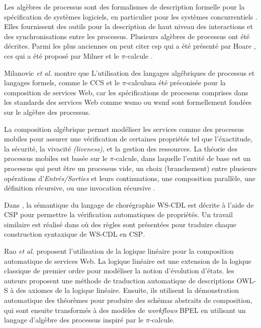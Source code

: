   Les algèbres de processus sont des formalismes de description
  formelle pour la spécification de systèmes logiciels, en particulier
  pour les systèmes concurrentiels \cite{dumez2010approche}. Elles
  fournissent des outils pour la description de haut niveau des
  interactions et des synchronisations entre les processus. Plusieurs
  algèbres de processus ont été décrites. Parmi les plus anciennes on
  peut citer \acrshort{csp} qui a été présenté par Hoare
  \cite{hoare1978communicating}, \acrshort{ccs} qui a été proposé par
  Milner \cite{milner1982finite, milner1989communication} et le
  $\pi$-calcule \cite{milner1992calculus}.\medskip

  Milanovic \textit{et al.} \cite{milanovic2004current} montre que
  L'utilisation des langages algébriques de processus et langages
  formels, comme le \textsc{CCS} et le $\pi$-calculusa été préconisée
  pour la composition de services Web, car les spécifications de
  processus comprises dans les standards des services Web comme
  \acrshort{wsmo} ou \acrshort{wsmf} sont formellement fondées sur le
  algèbre des processus.\medskip

  La composition algébrique permet modéliser les services comme des
  processus mobiles pour assurer une vérification de certaines
  propriétés tel que l'éxactitude, la sécurité, la vivacité
  \textit{(liveness)}, et la gestion des ressources. La théorie des
  processus mobiles est basée sur le $\pi$-calcule, dans laquelle
  l'entité de base est un processus qui peut être un processus vide,
  un choix (branchement) entre plusieurs opérations
  d'\textit{Entrés/Sorties} et leurs continuations, une composition
  parallèle, une définition récursive, ou une invocation récursive
  \cite{zahirathesis2008}.\medskip

  Dans \cite{koshkina2004modelling}, la sémantique du langage de
  chorégraphie \textsc{WS-CDL} est décrite à l'aide de \textsc{CSP}
  pour permettre la vérification automatiques de propriétés. Un
  travail similaire est réalisé dans \cite{li2007modeling} où des
  règles sont présentées pour traduire chaque construction syntaxique
  de \textsc{WS-CDL} en \textsc{CSP}.\medskip

  Rao \textit{et al.} \cite{rao2004logic} proposent l'utilisation de
  la logique linéaire pour la composition automatique de services
  Web. La logique linéaire est une extension de la logique classique
  de premier ordre pour modéliser la notion d'évolution d'états. les
  auteurs proposent une méthode de traduction automatique de
  descriptions \textsc{OWL-S} à des axiomes de la logique
  linéaire. Ensuite, ils utilisent la démonstration automatique des
  théorèmes pour produire des schémas abstraits de composition, qui
  sont ensuite transformés à des modèles de \textit{workflows}
  \textsc{BPEL} en utilisant un langage d'algèbre des processus
  inspiré par le $\pi$-calcule.\medskip

